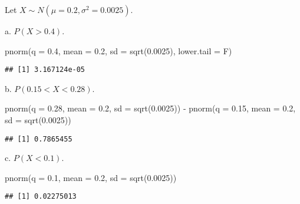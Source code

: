 \documentclass[
]{article}
\newenvironment{Shaded}{\begin{snugshade}}{\end{snugshade}}
\newcommand{\AttributeTok}[1]{\textcolor[rgb]{0.77,0.63,0.00}{#1}}
\newcommand{\FloatTok}[1]{\textcolor[rgb]{0.00,0.00,0.81}{#1}}
\newcommand{\FunctionTok}[1]{\textcolor[rgb]{0.00,0.00,0.00}{#1}}
\newcommand{\NormalTok}[1]{#1}
\newcommand{\SpecialCharTok}[1]{\textcolor[rgb]{0.00,0.00,0.00}{#1}}
\begin{document}
Let \(X \sim N(\mu = 0.2, \sigma^2 = 0.0025)\).

a. \(P(X > 0.4)\).\\

\begin{Shaded}
\begin{Highlighting}[]
\FunctionTok{pnorm}\NormalTok{(}\AttributeTok{q =} \FloatTok{0.4}\NormalTok{, }\AttributeTok{mean =} \FloatTok{0.2}\NormalTok{, }\AttributeTok{sd =} \FunctionTok{sqrt}\NormalTok{(}\FloatTok{0.0025}\NormalTok{), }\AttributeTok{lower.tail =}\NormalTok{ F)}
\end{Highlighting}
\end{Shaded}

\begin{verbatim}
## [1] 3.167124e-05
\end{verbatim}

b. \(P(0.15< X < 0.28)\).\\

\begin{Shaded}
\begin{Highlighting}[]
\FunctionTok{pnorm}\NormalTok{(}\AttributeTok{q =} \FloatTok{0.28}\NormalTok{, }\AttributeTok{mean =} \FloatTok{0.2}\NormalTok{, }\AttributeTok{sd =} \FunctionTok{sqrt}\NormalTok{(}\FloatTok{0.0025}\NormalTok{)) }\SpecialCharTok{{-}} \FunctionTok{pnorm}\NormalTok{(}\AttributeTok{q =} \FloatTok{0.15}\NormalTok{, }\AttributeTok{mean =} \FloatTok{0.2}\NormalTok{, }\AttributeTok{sd =} \FunctionTok{sqrt}\NormalTok{(}\FloatTok{0.0025}\NormalTok{))}
\end{Highlighting}
\end{Shaded}

\begin{verbatim}
## [1] 0.7865455
\end{verbatim}

c. \(P(X < 0.1)\).

\begin{Shaded}
\begin{Highlighting}[]
\FunctionTok{pnorm}\NormalTok{(}\AttributeTok{q =} \FloatTok{0.1}\NormalTok{, }\AttributeTok{mean =} \FloatTok{0.2}\NormalTok{, }\AttributeTok{sd =} \FunctionTok{sqrt}\NormalTok{(}\FloatTok{0.0025}\NormalTok{))}
\end{Highlighting}
\end{Shaded}

\begin{verbatim}
## [1] 0.02275013
\end{verbatim}
\end{document}
